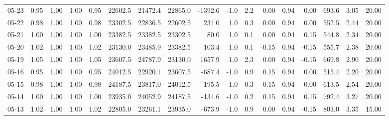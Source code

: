 \begin{threeparttable}
{\begin{tabular}{lrrrrrrrrrrrrrrrr}
  05-23 &         0.95 &           1.00 &          1.00 &          0.95 & 22602.5 & 21472.4 & 22865.0 &    -1392.6 &                     -1.0 &                 2.2 &       0.00 &      0.94 &           0.00 &            693.6 &            3.05 &                  20.00 \\
  05-22 &         0.98 &           1.00 &          1.00 &          0.98 & 23302.5 & 22836.5 & 22602.5 &      234.0 &                      1.0 &                 0.3 &       0.00 &      0.94 &           0.00 &            552.5 &            2.44 &                  20.00 \\
  05-21 &         1.00 &           1.00 &          1.00 &          1.00 & 23382.5 & 23382.5 & 23302.5 &       80.0 &                      1.0 &                 0.1 &       0.00 &      0.94 &           0.15 &            544.8 &            2.34 &                  20.00 \\
  05-20 &         1.02 &           1.00 &          1.00 &          1.02 & 23130.0 & 23485.9 & 23382.5 &      103.4 &                      1.0 &                 0.1 &      -0.15 &      0.94 &          -0.15 &            555.7 &            2.38 &                  20.00 \\
  05-19 &         1.05 &           1.00 &          1.00 &          1.05 & 23607.5 & 24787.9 & 23130.0 &     1657.9 &                      1.0 &                 2.3 &       0.00 &      0.94 &          -0.15 &            669.8 &            2.90 &                  20.00 \\
  05-16 &         0.95 &           1.00 &          1.00 &          0.95 & 24012.5 & 22920.1 & 23607.5 &     -687.4 &                     -1.0 &                 0.9 &       0.15 &      0.94 &           0.00 &            515.4 &            2.20 &                  20.00 \\
  05-15 &         0.98 &           1.00 &          1.00 &          0.98 & 24187.5 & 23817.0 & 24012.5 &     -195.5 &                     -1.0 &                 0.3 &       0.15 &      0.94 &           0.00 &            613.5 &            2.54 &                  20.00 \\
  05-14 &         1.00 &           1.00 &          1.00 &          1.00 & 23935.0 & 24052.9 & 24187.5 &     -134.6 &                     -1.0 &                 0.2 &       0.15 &      0.94 &           0.15 &            792.4 &            3.27 &                  20.00 \\
  05-13 &         1.02 &           1.00 &          1.00 &          1.02 & 22805.0 & 23261.1 & 23935.0 &     -673.9 &                     -1.0 &                 0.9 &       0.00 &      0.94 &          -0.15 &            803.0 &            3.35 &                  15.00 \\

\end{tabular}}
\end{threeparttable}
